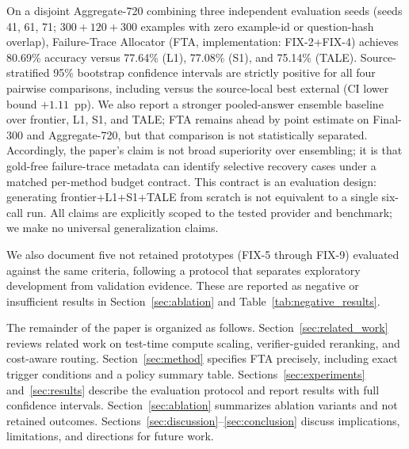 On a disjoint Aggregate-720 combining three independent evaluation seeds (seeds 41,
61, 71; $300 + 120 + 300$ examples with zero example-id or question-hash overlap),
Failure-Trace Allocator (FTA, implementation: FIX-2+FIX-4) achieves 80.69\% accuracy versus 77.64\% (L1), 77.08\% (S1), and
75.14\% (TALE).
Source-stratified 95\% bootstrap confidence intervals are strictly positive for all
four pairwise comparisons, including versus the source-local best external
(CI lower bound $+1.11$~pp).
We also report a stronger pooled-answer ensemble baseline over frontier, L1, S1,
and TALE; FTA remains ahead by point estimate on Final-300 and Aggregate-720, but
that comparison is not statistically separated.
Accordingly, the paper's claim is not broad superiority over ensembling; it is that
gold-free failure-trace metadata can identify selective recovery cases under a
matched per-method budget contract.
This contract is an evaluation design: generating frontier+L1+S1+TALE from scratch
is not equivalent to a single six-call run.
All claims are explicitly scoped to the tested provider and benchmark; we make no
universal generalization claims.

We also document five not retained prototypes (FIX-5 through FIX-9) evaluated
against the same criteria, following a protocol that separates exploratory
development from validation evidence.
These are reported as negative or insufficient results in Section~\ref{sec:ablation}
and Table~\ref{tab:negative_results}.

The remainder of the paper is organized as follows.
Section~\ref{sec:related_work} reviews related work on test-time compute scaling,
verifier-guided reranking, and cost-aware routing.
Section~\ref{sec:method} specifies FTA precisely, including exact trigger
conditions and a policy summary table.
Sections~\ref{sec:experiments} and~\ref{sec:results} describe the evaluation
protocol and report results with full confidence intervals.
Section~\ref{sec:ablation} summarizes ablation variants and not retained outcomes.
Sections~\ref{sec:discussion}--\ref{sec:conclusion} discuss implications,
limitations, and directions for future work.
